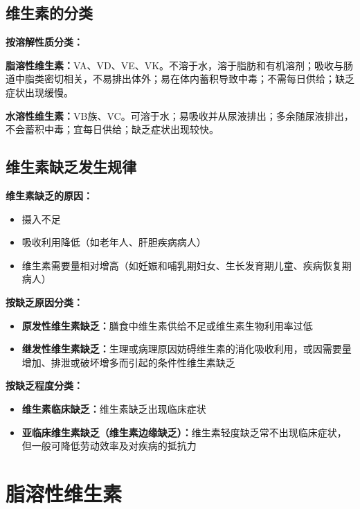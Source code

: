 \subsection{维生素的分类}

\begin{defbox}
\textbf{按溶解性质分类：}

\textbf{脂溶性维生素：}VA、VD、VE、VK。不溶于水，溶于脂肪和有机溶剂；吸收与肠道中脂类密切相关，不易排出体外；易在体内蓄积导致中毒；不需每日供给；缺乏症状出现缓慢。

\textbf{水溶性维生素：}VB族、VC。可溶于水；易吸收并从尿液排出；多余随尿液排出，不会蓄积中毒；宜每日供给；缺乏症状出现较快。
\end{defbox}

\subsection{维生素缺乏发生规律}

\begin{tipbox}
\difficulty \textbf{维生素缺乏的原因：}
\begin{itemize}[leftmargin=*]
    \item 摄入不足
    \item 吸收利用降低（如老年人、肝胆疾病病人）
    \item 维生素需要量相对增高（如妊娠和哺乳期妇女、生长发育期儿童、疾病恢复期病人）
\end{itemize}

\textbf{按缺乏原因分类：}
\begin{itemize}[leftmargin=*]
    \item \textbf{原发性维生素缺乏：}膳食中维生素供给不足或维生素生物利用率过低
    \item \textbf{继发性维生素缺乏：}生理或病理原因妨碍维生素的消化吸收利用，或因需要量增加、排泄或破坏增多而引起的条件性维生素缺乏
\end{itemize}

\textbf{按缺乏程度分类：}
\begin{itemize}[leftmargin=*]
    \item \textbf{维生素临床缺乏：}维生素缺乏出现临床症状
    \item \textbf{亚临床维生素缺乏（维生素边缘缺乏）：}维生素轻度缺乏常不出现临床症状，但一般可降低劳动效率及对疾病的抵抗力
\end{itemize}
\end{tipbox}

\section{脂溶性维生素}

